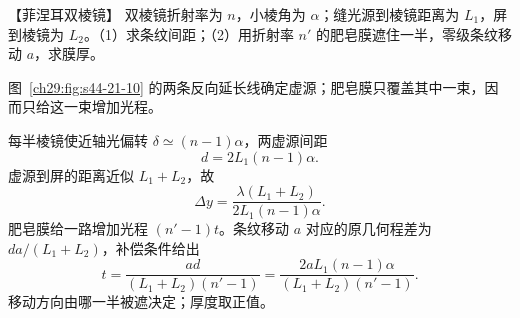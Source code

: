 \begin{origexamplebox}{【菲涅耳双棱镜】}\label{ch29:ex:s44-21-6}
双棱镜折射率为 $n$，小棱角为 $\alpha$；缝光源到棱镜距离为 $L_1$，屏到棱镜为 $L_2$。（1）求条纹间距；（2）用折射率 $n'$ 的肥皂膜遮住一半，零级条纹移动 $a$，求膜厚。

\begin{center}\begin{minipage}{.96\linewidth}\centering
{}
\end{minipage}\end{center}
\end{origexamplebox}\par\nopagebreak[3]
\begin{xesolution}
\BiprismDiagram
图~\ref{ch29:fig:s44-21-10} 的两条反向延长线确定虚源；肥皂膜只覆盖其中一束，因而只给这一束增加光程。

每半棱镜使近轴光偏转 $\delta\simeq(n-1)\alpha$，两虚源间距
\[
 d=2L_1(n-1)\alpha.
\]
虚源到屏的距离近似 $L_1+L_2$，故
\[
 \boxed{\Delta y=\frac{\lambda(L_1+L_2)}{2L_1(n-1)\alpha}}.
\]
肥皂膜给一路增加光程 $(n'-1)t$。条纹移动 $a$ 对应的原几何程差为 $da/(L_1+L_2)$，补偿条件给出
\[
 \boxed{t=\frac{ad}{(L_1+L_2)(n'-1)}
 =\frac{2aL_1(n-1)\alpha}{(L_1+L_2)(n'-1)}}.
\]
移动方向由哪一半被遮决定；厚度取正值。
\end{xesolution}

\DoubleMirrorDiagram

